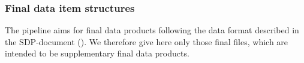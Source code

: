 
\clearpage
\subsubsection{Final data item structures}\label{sssec:lssfinaldatastructs}
The pipeline aims for final data products following the data format described in the \ac{SDP}-document (\cite{ESO-products_standard}). We therefore give here only those final files, which are intended to be supplementary final data products.

